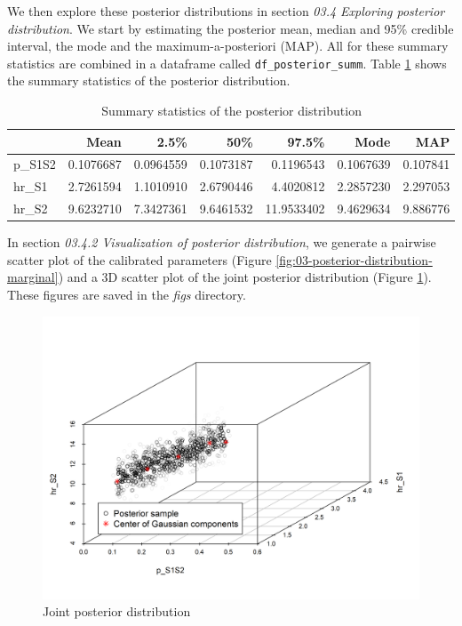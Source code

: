 \documentclass[]{book}
\begin{document}
We then explore these posterior distributions in section \emph{03.4
Exploring posterior distribution}. We start by estimating the posterior
mean, median and 95\% credible interval, the mode and the
maximum-a-posteriori (MAP). All for these summary statistics are
combined in a dataframe called \texttt{df\_posterior\_summ}. Table
\ref{tab:SummaryCal} shows the summary statistics of the posterior
distribution.

\begin{table}[t]

\caption{\label{tab:SummaryCal}Summary statistics of the posterior distribution}
\centering
\begin{tabular}{l|r|r|r|r|r|r}
\hline
  & Mean & 2.5\% & 50\% & 97.5\% & Mode & MAP\\
\hline
p\_S1S2 & 0.1076687 & 0.0964559 & 0.1073187 & 0.1196543 & 0.1067639 & 0.107841\\
\hline
hr\_S1 & 2.7261594 & 1.1010910 & 2.6790446 & 4.4020812 & 2.2857230 & 2.297053\\
\hline
hr\_S2 & 9.6232710 & 7.3427361 & 9.6461532 & 11.9533402 & 9.4629634 & 9.886776\\
\hline
\end{tabular}
\end{table}

In section \emph{03.4.2 Visualization of posterior distribution}, we
generate a pairwise scatter plot of the calibrated parameters (Figure
\ref{fig:03-posterior-distribution-marginal}) and a 3D scatter plot of
the joint posterior distribution (Figure
\ref{fig:Posterior-distribution-joint}). These figures are saved in the
\emph{figs} directory.

\begin{figure}

{\centering \includegraphics[width=1\linewidth]{../figs/03_posterior_distribution_joint} 

}

\caption{Joint posterior distribution}\label{fig:Posterior-distribution-joint}
\end{figure}
\end{document}
